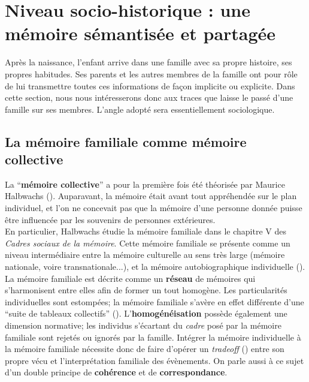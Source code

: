 \documentclass[french]{article}
\begin{document}
		\section{Niveau socio-historique : une mémoire sémantisée et partagée}\label{socio}
			Après la naissance, l'enfant arrive dans une famille avec sa propre histoire, ses propres habitudes. Ses parents et les autres membres de la famille ont pour rôle de lui transmettre toutes ces informations de façon implicite ou explicite. Dans cette section, nous nous intéresserons donc aux traces que laisse le passé d'une famille sur ses membres. L'angle adopté sera essentiellement sociologique.
		
		\subsection{La mémoire familiale comme mémoire collective}\label{collec}
			La ``\textbf{mémoire collective}'' a pour la première fois été théorisée par Maurice Halbwachs (\cite{halbwachs1925,halbwachs1950}). Auparavant, la mémoire était avant tout appréhendée sur le plan individuel, et l'on ne concevait pas que la mémoire d'une personne donnée puisse être influencée par les souvenirs de personnes extérieures.\\
			En particulier, Halbwachs étudie la mémoire familiale dans le chapitre V des \textit{Cadres sociaux de la mémoire}.  Cette mémoire familiale se présente comme un niveau intermédiaire entre la mémoire culturelle au sens très large (mémoire nationale, voire transnationale...), et la mémoire autobiographique individuelle (\cite{boesen2012}). La mémoire familiale est décrite comme un \textbf{réseau} de mémoires qui s'harmonisent entre elles afin de former un tout homogène. Les particularités individuelles sont estompées; la mémoire familiale s'avère en effet différente d'une ``suite de tableaux collectifs'' (\cite[p.~110]{halbwachs1925}). L'\textbf{homogénéisation} possède également une dimension normative; les individus s'écartant du \textit{cadre} posé par la  mémoire familiale sont rejetés ou ignorés par la famille. Intégrer la mémoire individuelle à la mémoire familiale nécessite donc de faire d'opérer un \textit{tradeoff} (\cite{muxel2012}) entre son propre vécu et l'interprétation familiale des évènements. On parle aussi à ce sujet d'un double principe de \textbf{cohérence} et de \textbf{correspondance}.\\
\end{document}
